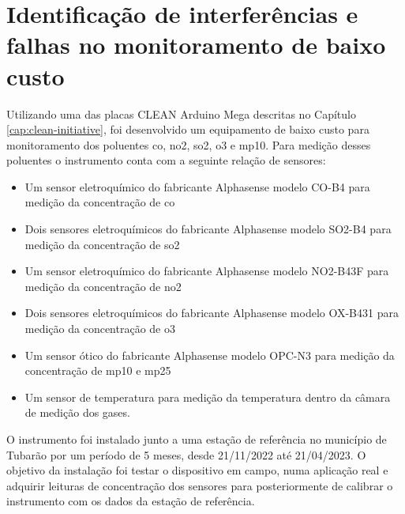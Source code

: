 \chapter{Identificação de interferências e falhas no monitoramento de baixo custo}\label{cap:field-monit-results}

Utilizando uma das placas CLEAN Arduino Mega descritas no Capítulo \ref{cap:clean-initiative}, foi desenvolvido um equipamento de baixo custo para monitoramento dos poluentes \acrshort{co}, \acrshort{no2}, \acrshort{so2}, \acrshort{o3} e \acrshort{mp10}. Para medição desses poluentes o instrumento conta com a seguinte relação de sensores:

\begin{itemize}
    \item Um sensor eletroquímico do fabricante Alphasense modelo CO-B4 para medição da concentração de \acrshort{co}
    \item Dois sensores eletroquímicos do fabricante Alphasense modelo SO2-B4 para medição da concentração de \acrshort{so2}
    \item Um sensor eletroquímico do fabricante Alphasense modelo NO2-B43F para medição da concentração de \acrshort{no2}
    \item Dois sensores eletroquímicos do fabricante Alphasense modelo OX-B431 para medição da concentração de \acrshort{o3}
    \item Um sensor ótico do fabricante Alphasense modelo OPC-N3 para medição da concentração de \acrshort{mp10} e \acrshort{mp25}
    \item Um sensor de temperatura para medição da temperatura dentro da câmara de medição dos gases.
\end{itemize}

O instrumento foi instalado junto a uma estação de referência no município de Tubarão por um período de 5 meses, desde 21/11/2022 até 21/04/2023. O objetivo da instalação foi testar o dispositivo em campo, numa aplicação real e adquirir leituras de concentração dos sensores para posteriormente de calibrar o instrumento com os dados da estação de referência.







